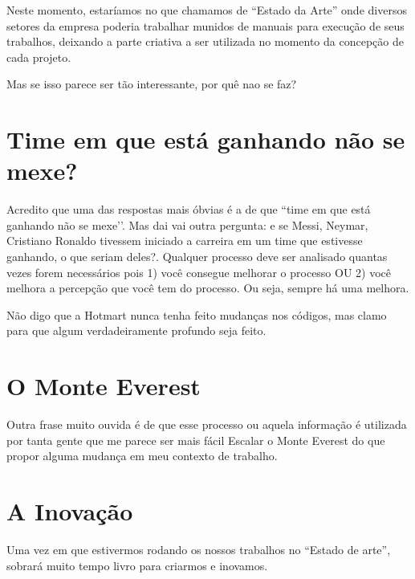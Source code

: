 \documentclass[a4paper,twoside]{article}
\begin{document}
Neste momento, estaríamos no que chamamos de ``Estado da Arte'' onde diversos setores da empresa poderia trabalhar munidos de manuais para execução de seus trabalhos, deixando a parte criativa a ser utilizada no momento da concepção de cada projeto. 

Mas se isso parece ser tão interessante, por quê nao se faz?

\section{Time em que está ganhando não se mexe?}

Acredito que uma das respostas mais óbvias é a de que ``time em que está ganhando não se mexe’’. Mas dai vai outra pergunta: e se Messi, Neymar, Cristiano Ronaldo tivessem iniciado a carreira em um time que estivesse ganhando, o que seriam deles?. Qualquer processo deve ser analisado quantas vezes forem necessários pois 1) você consegue melhorar o processo OU 2) você melhora a percepção que você tem do processo. Ou seja, sempre há uma melhora.

Não digo que a Hotmart nunca tenha feito mudanças nos códigos, mas clamo para que algum verdadeiramente profundo seja feito.

\section{O Monte Everest}

Outra frase muito ouvida é de que esse processo ou aquela informação é utilizada por tanta gente que me parece ser mais fácil Escalar o Monte Everest do que propor alguma mudança em meu contexto de trabalho.

\section{A Inovação}

Uma vez em que estivermos rodando os nossos trabalhos no ``Estado de arte'', sobrará muito tempo livro para criarmos e inovamos. 
\end{document}

